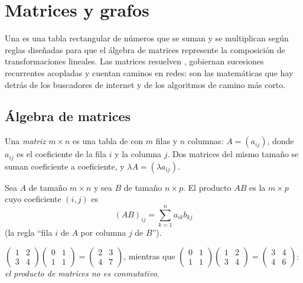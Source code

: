 \chapter{Matrices y grafos}\label{ch:g12:matrix}

Una  es una tabla rectangular de números que se suman y se
multiplican según reglas diseñadas para que el álgebra de matrices
represente la composición de transformaciones lineales. Las matrices
resuelven , gobiernan sucesiones recurrentes acopladas y
cuentan caminos en redes: son las matemáticas que hay detrás de los
buscadores de internet y de los algoritmos de camino más corto.

\section{Álgebra de matrices}

\begin{definition}[Matriz]\label{def:g12:matrix:matrix}
Una \emph{matriz $m \times n$} es una tabla de 
con $m$ filas y $n$ columnas: $A = (a_{ij})$, donde $a_{ij}$ es el
coeficiente de la fila $i$ y la columna $j$. Dos matrices del mismo tamaño
se suman coeficiente a coeficiente, y $\lambda A = (\lambda a_{ij})$.
\end{definition}

\begin{definition}\label{def:g12:matrix:product}
Sea $A$ de tamaño $m \times n$ y sea $B$ de tamaño $n \times p$. El
producto $AB$ es la  $m \times p$ cuyo coeficiente $(i,j)$ es
\[
(AB)_{ij} = \sum_{k=1}^{n} a_{ik} b_{kj}
\]
(la regla ``fila $i$ de $A$ por columna $j$ de $B$'').
\end{definition}

\begin{example}
$\begin{pmatrix} 1 & 2\\ 3 & 4\end{pmatrix}
\begin{pmatrix} 0 & 1\\ 1 & 1\end{pmatrix}
= \begin{pmatrix} 2 & 3\\ 4 & 7\end{pmatrix}$,
\quad mientras que \quad
$\begin{pmatrix} 0 & 1\\ 1 & 1\end{pmatrix}
\begin{pmatrix} 1 & 2\\ 3 & 4\end{pmatrix}
= \begin{pmatrix} 3 & 4\\ 4 & 6\end{pmatrix}$:
\emph{el producto de matrices no es conmutativo}.
\end{example}

